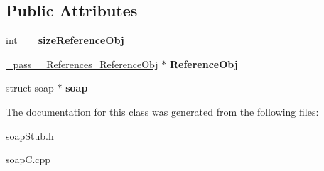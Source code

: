 \subsection*{Public Attributes}
\begin{DoxyCompactItemize}
\item 
\hypertarget{class__pass____References_ab156c226aa5ce6d650178b5d22c2a4cd}{
int {\bfseries \_\-\_\-sizeReferenceObj}}
\label{class__pass____References_ab156c226aa5ce6d650178b5d22c2a4cd}

\item 
\hypertarget{class__pass____References_abbd02871f08ffaab181f355343f8327f}{
\hyperlink{class__pass____References__ReferenceObj}{\_\-pass\_\-\_\-References\_\-ReferenceObj} $\ast$ {\bfseries ReferenceObj}}
\label{class__pass____References_abbd02871f08ffaab181f355343f8327f}

\item 
\hypertarget{class__pass____References_ae310d7f4bcda514b6a1f013111865f50}{
struct soap $\ast$ {\bfseries soap}}
\label{class__pass____References_ae310d7f4bcda514b6a1f013111865f50}

\end{DoxyCompactItemize}


The documentation for this class was generated from the following files:\begin{DoxyCompactItemize}
\item 
soapStub.h\item 
soapC.cpp\end{DoxyCompactItemize}
